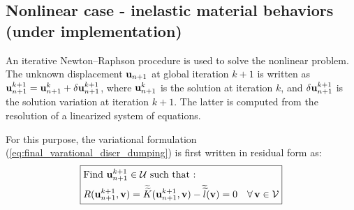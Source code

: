 \subsection{Nonlinear case - inelastic material behaviors (under implementation)}

An iterative Newton--Raphson procedure is used to solve the nonlinear
problem. The unknown displacement ${{\bf{u}}_{n+1}}$ at global iteration
$k+1$ is written as ${{\bf{u}}_{n+1}^{k+1}}={{\bf{u}}_{n+1}^{k}}+\delta{{\bf{u}}_{n+1}^{k+1}}$,
where ${{\bf{u}}_{n+1}^{k}}$ is the solution at iteration $k$, and $\delta{{\bf{u}}_{n+1}^{k+1}}$
is the solution variation at iteration $k+1$. The latter is computed
from the resolution of a linearized system of equations. 

For this purpose, the variational formulation (\ref{eq:final_varational_discr_dumping}) is first written in residual form as:
\begin{equation}
\boxed{\begin{aligned} & \text{Find \ensuremath{{{\bf{u}}_{n+1}^{k+1}}\in\mathcal{U}} such that : }\\
 & R({{\bf{u}}_{n+1}^{k+1}},{\bf{v}})=\widetilde{\widetilde{K}}({\bf{u}}_{n+1}^{k+1},{\bf{v}})-\widetilde{\widetilde{l}}({\bf{v}})=0\quad\text{\ensuremath{\forall\,}}{\bf{v}}\in\mathcal{V}
\end{aligned}
}
\end{equation}

